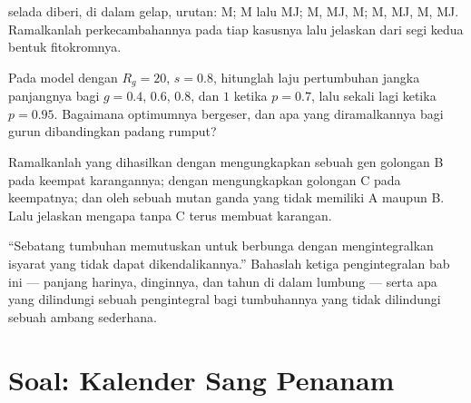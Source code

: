 \begin{exercise}[$\star\star$]\label{exo:b2:plant-flowering:9}
 selada diberi, di dalam gelap, urutan: M; M lalu MJ; M, MJ, M;
M, MJ, M, MJ. Ramalkanlah perkecambahannya pada tiap kasusnya lalu
jelaskan dari segi kedua bentuk fitokromnya.
\end{exercise}

\begin{exercise}[$\star\star\star$]\label{exo:b2:plant-flowering:10}
Pada model  dengan $R_g = 20$, $s = 0.8$,
hitunglah laju pertumbuhan jangka panjangnya bagi $g = 0.4$, $0.6$,
$0.8$, dan $1$ ketika $p = 0.7$, lalu sekali lagi ketika $p = 0.95$.
Bagaimana optimumnya bergeser, dan apa yang diramalkannya bagi gurun
dibandingkan padang rumput?
\end{exercise}

\begin{exercise}[$\star\star\star$]\label{exo:b2:plant-flowering:11}
Ramalkanlah  yang dihasilkan dengan mengungkapkan sebuah gen
golongan B pada keempat karangannya; dengan mengungkapkan golongan C
pada keempatnya; dan oleh sebuah mutan ganda yang tidak memiliki A
maupun B. Lalu jelaskan mengapa  tanpa C terus membuat karangan.
\end{exercise}

\begin{exercise}[$\star\star\star$]\label{exo:b2:plant-flowering:12}
``Sebatang tumbuhan memutuskan untuk berbunga dengan mengintegralkan
isyarat yang tidak dapat dikendalikannya.'' Bahaslah ketiga
pengintegralan bab ini --- panjang harinya, dinginnya, dan tahun di
dalam lumbung  --- serta apa yang dilindungi sebuah pengintegral
bagi tumbuhannya yang tidak dilindungi sebuah ambang sederhana.
\end{exercise}

\section{Soal: Kalender Sang Penanam}

